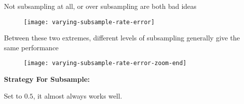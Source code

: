 %
\begin{frame}
Not subsampling at all, or over subsampling are both bad ideas

  \begin{figure}
    \texttt{[image: varying-subsample-rate-error]}
  \end{figure}
 
\end{frame}
%
\begin{frame}
Between these two extremes, different levels of subsampling generally give the same performance

  \begin{figure}
    \texttt{[image: varying-subsample-rate-error-zoom-end]}
  \end{figure}
  
\end{frame}
%
\begin{frame}
\textbf{Strategy For Subsample:}

Set to $0.5$, it almost always works well.
\end{frame}

  